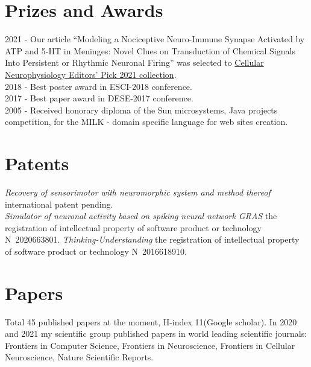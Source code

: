 \documentclass{moderncv}
\begin{document}
    \cvitem{ }{ }
    
    \section{Prizes and Awards}
    2021 - Our article ``Modeling a Nociceptive Neuro-Immune Synapse Activated by ATP and 5-HT in Meninges: Novel Clues on Transduction of Chemical Signals Into Persistent or Rhythmic Neuronal Firing'' was selected to \href{https://www.frontiersin.org/research-topics/21434/cellular-neurophysiology-editors-pick-2021}{Cellular Neurophysiology Editors' Pick 2021 collection}.\\
    2018 - Best poster award in ESCI-2018 conference.\\
    2017 - Best paper award in DESE-2017 conference.\\
    2005 - Received honorary diploma of the Sun microsystems, Java projects competition, for the MILK - domain specific language for web sites creation.

    \section{Patents}
    \emph{Recovery of sensorimotor with neuromorphic system and method thereof} international patent pending.\\
    \emph{Simulator of neuronal activity based on spiking neural network GRAS} the registration of intellectual property of software product or technology N~2020663801.
    \emph{Thinking-Understanding} the registration of intellectual property of software product or technology N~2016618910.\\
    
    
    \section{Papers}
    Total 45 published papers at the moment, H-index 11(Google scholar).
    In 2020 and 2021 my scientific group published papers in world leading scientific journals:
    Frontiers in Computer Science, Frontiers in Neuroscience, Frontiers in Cellular Neuroscience, Nature Scientific Reports.

\end{document}
